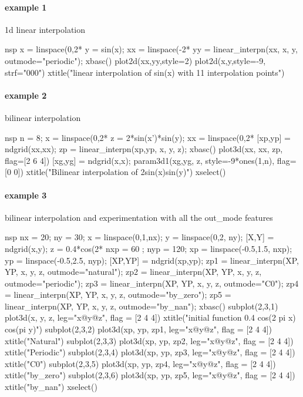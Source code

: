 
\begin{examples}
\paragraph{example 1}  1d linear interpolation
\begin{mintednsp}{nsp}
x = linspace(0,2*%
y = sin(x);
xx = linspace(-2*%
yy = linear_interpn(xx, x, y, outmode="periodic");
xbasc()
plot2d(xx,yy,style=2)
plot2d(x,y,style=-9, strf="000")
xtitle("linear interpolation of sin(x) with 11 interpolation points")
\end{mintednsp}

\paragraph{example 2} bilinear interpolation
\begin{mintednsp}{nsp}
n = 8;
x = linspace(0,2*%
z = 2*sin(x')*sin(y);
xx = linspace(0,2*%
[xp,yp] = ndgrid(xx,xx);
zp = linear_interpn(xp,yp, x, y, z);
xbasc()
plot3d(xx, xx, zp, flag=[2 6 4])
[xg,yg] = ndgrid(x,x);
param3d1(xg,yg, z, style=-9*ones(1,n), flag=[0 0])
xtitle("Bilinear interpolation of 2sin(x)sin(y)")
xselect()
\end{mintednsp}

\paragraph{example 3} bilinear interpolation and experimentation with all the out\_mode features
\begin{mintednsp}{nsp}
nx = 20; ny = 30;
x = linspace(0,1,nx);
y = linspace(0,2, ny);
[X,Y] = ndgrid(x,y);
z = 0.4*cos(2*%
nxp = 60 ; nyp = 120;
xp = linspace(-0.5,1.5, nxp);
yp = linspace(-0.5,2.5, nyp);
[XP,YP] = ndgrid(xp,yp);
zp1 = linear_interpn(XP, YP, x, y, z, outmode="natural");
zp2 = linear_interpn(XP, YP, x, y, z, outmode="periodic");
zp3 = linear_interpn(XP, YP, x, y, z, outmode="C0");
zp4 = linear_interpn(XP, YP, x, y, z, outmode="by_zero");
zp5 = linear_interpn(XP, YP, x, y, z, outmode="by_nan");
xbasc()
subplot(2,3,1)
   plot3d(x, y, z, leg="x@y@z", flag = [2 4 4])
   xtitle("initial function 0.4 cos(2 pi x) cos(pi y)")
subplot(2,3,2)
   plot3d(xp, yp, zp1, leg="x@y@z", flag = [2 4 4])
   xtitle("Natural")
subplot(2,3,3)
   plot3d(xp, yp, zp2, leg="x@y@z", flag = [2 4 4])
   xtitle("Periodic")
subplot(2,3,4)
   plot3d(xp, yp, zp3, leg="x@y@z", flag = [2 4 4])
   xtitle("C0")
subplot(2,3,5)
   plot3d(xp, yp, zp4, leg="x@y@z", flag = [2 4 4])
   xtitle("by_zero")
subplot(2,3,6)
   plot3d(xp, yp, zp5, leg="x@y@z", flag = [2 4 4])
   xtitle("by_nan")
xselect()
\end{mintednsp}



\end{examples}
